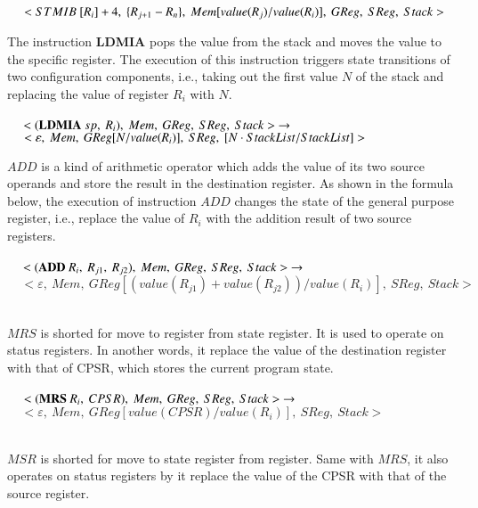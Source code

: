 \documentclass[letterpaper, 10 pt, conference]{IEEEtran}
\begin{document}
$~~~~~<STMIB~[R_i]+4,~\{R_{j+1}-R_n\},~Mem[value(R_j)/value(R_i)],~GReg,~SReg,~Stack>\\ \\$
\par The instruction \textbf{LDMIA} pops the value from the stack and moves the value to the specific register. The execution of this instruction triggers state transitions of two configuration components, i.e., taking out the first value $N$ of the stack and replacing the value of register $R_i$ with $N$.  \\ \\
$~~~~~<(\textbf{LDMIA} ~sp,~R_i),~Mem,~GReg,~SReg,~Stack>~\rightarrow\\ \\$
$~~~~~<\varepsilon,~Mem,~GReg[N/value(R_i)],~SReg,~[N\cdot StackList/StackList]>\\ \\$
\par $ADD$ is a kind of arithmetic operator which adds the value of its two source operands and store the result in the destination register. As shown in the formula below, the execution of instruction $ADD$ changes the state of the general purpose register, i.e., replace the value of $R_i$ with the addition result of two source registers.\\ \\
$~~~~~<(\textbf{ADD}~R_i,~R_{j1},~R_{j2}),~Mem,~GReg,~SReg,~Stack>~\rightarrow\\ \\$
$~~~~~<\varepsilon,~Mem,~GReg[(value(R_{j1})+value(R_{j2}))/value(R_i)],~SReg,~Stack>$\\ \\
\par $MRS$ is shorted for move to register from state register. It is used to operate on status registers. In another words, it replace the value of the destination register with that of CPSR, which stores the current program state. \\ \\
$~~~~~<(\textbf{MRS}~R_i,~CPSR),~Mem,~GReg,~SReg,~Stack>~\rightarrow\\ \\$
$~~~~~<\varepsilon,~Mem,~GReg[value(CPSR)/value(R_i)],~SReg,~Stack>$\\ \\
\par $MSR$ is shorted for move to state register from register. Same with $MRS$, it also operates on status registers by it replace the value of the CPSR with that of the source register.\\ \\
\end{document}
